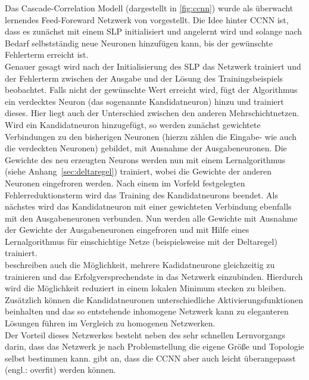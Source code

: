 Das Cascade-Correlation Modell (dargestellt in \autoref{fig:ccnn}) wurde als überwacht lernendes Feed-Foreward Netzwerk von \citet{Fahlman1990} vorgestellt. Die Idee hinter \gls{CCNN} ist, dass es zunächst mit einem SLP initialisiert und angelernt wird und solange nach Bedarf selbstständig neue Neuronen hinzufügen kann, bis der gewünschte Fehlerterm erreicht ist.\\
Genauer gesagt wird nach der Initialisierung des SLP das Netzwerk trainiert und der Fehlerterm zwischen der Ausgabe und der Lösung des Trainingsbeispiels beobachtet. Falls nicht der gewünschte Wert erreicht wird, fügt der Algorithmus ein verdecktes Neuron (das sogenannte Kandidatneuron) hinzu und trainiert dieses. Hier liegt auch der Unterschied zwischen den anderen Mehrschichtnetzen. Wird ein Kandidatneuron hinzugefügt, so werden zunächst gewichtete Verbindungen zu den bisherigen Neuronen (hierzu zählen die Eingabe- wie auch die verdeckten Neuronen) gebildet, mit Ausnahme der Ausgabeneuronen. Die Gewichte des neu erzeugten Neurons werden nun mit einem Lernalgorithmus (siehe Anhang~\ref{sec:deltaregel}) trainiert, wobei die Gewichte der anderen Neuronen eingefroren werden. Nach einem im Vorfeld festgelegten Fehlerreduktionsterm wird das Training des Kandidatneurons beendet. Als nächstes wird das Kandidatneuron mit einer gewichteten Verbindung ebenfalls mit den Ausgabeneuronen verbunden. Nun werden alle Gewichte mit Ausnahme der Gewichte der Ausgabeneuronen eingefroren und mit Hilfe eines Lernalgorithmus für einschichtige Netze (beispielsweise mit der Deltaregel) trainiert.\\
\citet{Fahlman1990} beschreiben auch die Möglichkeit, mehrere Kadidatneurone gleichzeitig zu trainieren und das Erfolgversprechendste in das Netzwerk einzubinden. Hierdurch wird die Möglichkeit reduziert in einem lokalen Minimum stecken zu bleiben. Zusätzlich können die Kandidatneuronen unterschiedliche Aktivierungsfunktionen beinhalten und das so entstehende inhomogene Netzwerk kann zu eleganteren Lösungen führen im Vergleich zu homogenen Netzwerken.\\
Der Vorteil dieses Netzwerkes besteht neben des sehr schnellen Lernvorgangs darin, dass das Netzwerk je nach Problemstellung die eigene Größe und Topologie selbst bestimmen kann. \citet{Balazs2009} gibt an, dass die CCNN aber auch leicht überangepasst (engl.: overfit) werden können.\\

